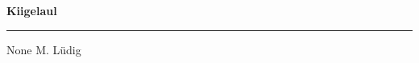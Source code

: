 \documentclass[10pt]{book}
\begin{document}
{
  \samepage
  \raggedbottom
  \raggedright
  \sloppy


  \vspace{0.2in}

  \noindent\begin{minipage}{.1\textwidth}
    \hfill\vspace{0.1in}
  \end{minipage}%
  \noindent\begin{minipage}{.8\textwidth}
    \centering
    \bfseries
    \large Kiigelaul
  \end{minipage}%
  \noindent\begin{minipage}{.1\textwidth}
      \hfill\vspace{0.1in}
  \end{minipage}

  \nopagebreak[4]
  \vspace{0.1in}
  \nopagebreak[4]
  \hrule height 0.05ex
  \nopagebreak[4]
  \vspace{-0.05in}

  {\footnotesize None \hfill M. L\"udig }\\
  \vspace{0.01in}



}
\end{document}
